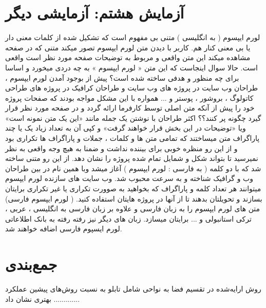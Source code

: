 \FloatBarrier
\section{آزمایش هشتم: آزمایشی دیگر}
لورم ایپسوم ( به انگلیسی  ) متنی بی مفهوم است که تشکیل شده از کلمات معنی دار یا بی معنی کنار هم. کاربر با دیدن متن لورم ایپسوم تصور میکند متنی که در صفحه مشاهده میکند این متن واقعی و مربوط به توضیحات صفحه مورد نظر است واقعی است. حالا سوال اینجاست که این متن « لورم ایپسوم » به چه دردی میخورد و اساسا برای چه منظور و هدفی ساخته شده است؟ پیش از بوجود آمدن لورم ایپسوم ، طراحان وب سایت در پروژه های وب سایت و طراحان کرافیک در پروژه های طراحی کاتولوگ ، بروشور ، پوستر و ... همواره با این مشکل مواجه بودند که صفحات پروژه خود را پیش از آنکه متن اصلی توسط کارفرما ارائه گردد و در صفحه مورد نظر قرار گیرد چگونه پر کنند؟؟ اکثر طراحان با نوشتن یک جمله مانند «این یک متن نمونه است» ویا «توضیحات در این بخش قرار خواهند گرفت» و کپی آن به تعداد زیاد یک یا چند پاراگراف متن میساختند که تمامی متن ها و کلمات ، جملات و پاراگراف ها تکراری بود و از این رو منظره خوبی برای بیننده نداشت و ضمنا به هیچ وجه واقعی به نظر نمیرسید تا بتواند شکل و شمایل تمام شده پروژه را نشان دهد. از این رو متنی ساخته شد که با دو کلمه ( به فارسی : لورم ایپسوم ) آغاز میشد وبا همین نام در بین طراحان وب و گرافیک شناخته و به سرعت محبوب شد. وب سایت های سازنده لورم ایپسوم میتوانند هر تعداد کلمه و پاراگراف که بخواهید به صوورت تکراری یا غیر تکراری برایتان بسازند و تحویلتان بدهند تا از آنها در پروژه هایتان استفاده کنید. ( لورم ایپسوم فارسی) متن های لورم ایپسوم را به زبان فارسی و علاوه بر زبان فارسی به انگلیسی ، عربی ، ترکی استانبولی و ... برایتان میسازد. زبان های دیگر نیز رفته رفته به بانک اطلاعاتی لورم ایسپوم فارسی اضافه خواهند شد.  


\FloatBarrier
\section{جمع‌بندی}

روش ارایه‌شده در تقسیم فضا به نواحی شامل تابلو به نسبت روش‌های پیشین عملکرد بهتری نشان داد .............


